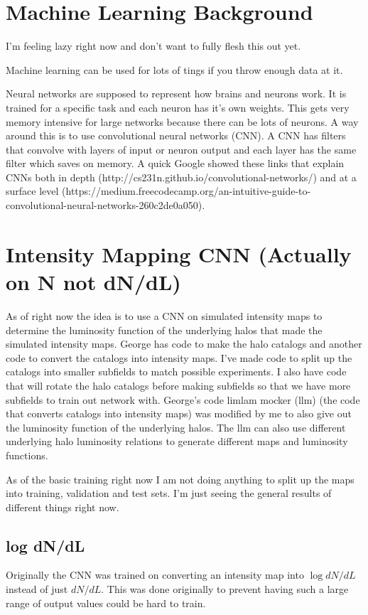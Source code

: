 \documentclass{article}
\begin{document}
	\section{Machine Learning Background} \label{sec:MLback}

		I'm feeling lazy right now and don't want to fully flesh this out yet.

		Machine learning can be used for lots of tings if you throw enough data at it.  

		Neural networks are supposed to represent how brains and neurons work.  It is trained for a specific task and each neuron has it's own weights.  This gets very memory intensive for large networks because there can be lots of neurons.  A way around this is to use convolutional neural networks (CNN).  A CNN has filters that convolve with layers of input or neuron output and each layer has the same filter which saves on memory.  A quick Google showed these links that explain CNNs both in depth (http://cs231n.github.io/convolutional-networks/) and at a surface level (https://medium.freecodecamp.org/an-intuitive-guide-to-convolutional-neural-networks-260c2de0a050).

	\section{Intensity Mapping CNN (Actually on N not dN/dL)} \label{sec:cnn}

		As of right now the idea is to use a CNN on simulated intensity maps to determine the luminosity function of the underlying halos that made the simulated intensity maps.  George has code to make the halo catalogs and another code to convert the catalogs into intensity maps.  I've made code to split up the catalogs into smaller subfields to match possible experiments.  I also have code that will rotate the halo catalogs before making subfields so that we have more subfields to train out network with.  George's code limlam mocker (llm) (the code that converts catalogs into intensity maps) was modified by me to also give out the luminosity function of the underlying halos.  The llm can also use different underlying halo luminosity relations to generate different maps and luminosity functions.

		As of the basic training right now I am not doing anything to split up the maps into training, validation and test sets.  I'm just seeing the general results of different things right now.

		\subsection{log dN/dL} \label{sec:logValue}
			Originally the CNN was trained on converting an intensity map into \(\log dN/dL\) instead of just \(dN/dL\).  This was done originally to prevent having such a large range of output values could be hard to train.
\end{document}
